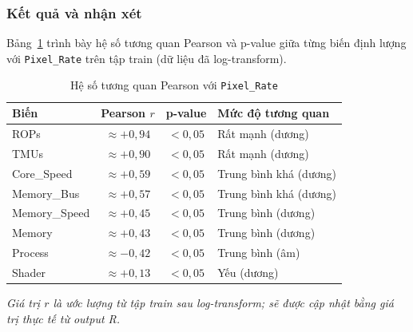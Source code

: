 \subsubsection{Kết quả và nhận xét}

Bảng~\ref{tab:pearson} trình bày hệ số tương quan Pearson và p-value giữa từng
biến định lượng với \texttt{Pixel\_Rate} trên tập train (dữ liệu đã log-transform).

\begin{table}[H]
  \centering
  \caption{Hệ số tương quan Pearson với \texttt{Pixel\_Rate}}
  \label{tab:pearson}
  \begin{tabular}{lccl}
    \toprule
    \textbf{Biến} & \textbf{Pearson $r$} & \textbf{p-value} & \textbf{Mức độ tương quan} \\
    \midrule
    ROPs          & $\approx +0{,}94$ & $<0{,}05$ & Rất mạnh (dương) \\
    TMUs          & $\approx +0{,}90$ & $<0{,}05$ & Rất mạnh (dương) \\
    Core\_Speed   & $\approx +0{,}59$ & $<0{,}05$ & Trung bình khá (dương) \\
    Memory\_Bus   & $\approx +0{,}57$ & $<0{,}05$ & Trung bình khá (dương) \\
    Memory\_Speed & $\approx +0{,}45$ & $<0{,}05$ & Trung bình (dương) \\
    Memory        & $\approx +0{,}43$ & $<0{,}05$ & Trung bình (dương) \\
    Process       & $\approx -0{,}42$ & $<0{,}05$ & Trung bình (âm) \\
    Shader        & $\approx +0{,}13$ & $<0{,}05$ & Yếu (dương) \\
    \bottomrule
  \end{tabular}
  \par\smallskip
  \footnotesize\textit{Giá trị $r$ là ước lượng từ tập train sau log-transform; sẽ được cập nhật bằng giá trị thực tế từ output R.}
\end{table}

